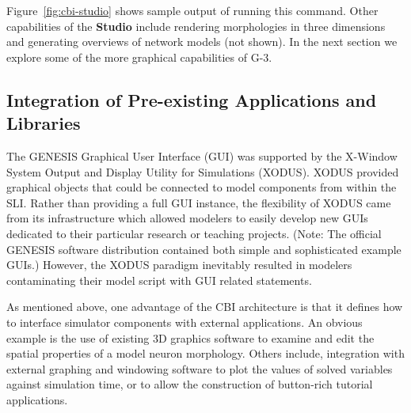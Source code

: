 \documentclass[10pt]{article}
\begin{document}
Figure~\ref{fig:cbi-studio} shows sample output of running this
command.  Other capabilities of the {\bf Studio} include rendering
morphologies in three dimensions and generating overviews of network
models (not shown).  In the next section we explore some of the more graphical
capabilities of G-3.

\subsection*{Integration of Pre-existing Applications and Libraries}

The GENESIS Graphical User Interface (GUI) was supported by the
X-Window System Output and Display Utility for Simulations (XODUS).
XODUS provided graphical objects that could be
connected to model components from within the SLI.  Rather than
providing a full GUI instance, the flexibility of XODUS came from its
infrastructure which allowed modelers to easily develop new GUIs
dedicated to their particular research or teaching projects. (Note: The
  official GENESIS software distribution contained both simple and
  sophisticated example GUIs.)  However, the XODUS paradigm
inevitably resulted in modelers contaminating their model script with GUI
related statements.

As mentioned above, one advantage of the CBI architecture is that it defines how to interface simulator components
with external applications.  An obvious example is the use of existing
3D graphics software to examine and edit the spatial properties of a
model neuron morphology.  Others include, integration with external
graphing and windowing software to plot the values of solved
variables against simulation time, or to allow the construction of
button-rich tutorial applications.
\end{document}
